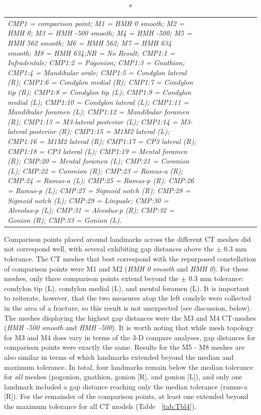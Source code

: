 \documentclass[review]{elsarticle}
\begin{document}
\begin{center}
\begin{longtable}{lrrrrrrrr}
\caption*{\textit{CMP1 = comparison point; M1 = HMH 0 smooth; M2 = HMH 0; M3 = HMH -500 smooth; M4 = HMH -500; M5 = HMH 562 smooth; M6 = HMH 562; M7 = HMH 634 smooth; M8 = HMH 634;NR = No Result; CMP1:1 = Infradentale; CMP1:2 = Pogonion; CMP1:3 = Gnathion; CMP1:4 = Mandibular orale; CMP1:5 = Condylon lateral (R); CMP1:6 = Condylon medial (R); CMP1:7 = Condylon tip (R); CMP1:8 = Condylon tip (L); CMP1:9 = Condylon medial (L); CMP1:10 = Condylon lateral (L); CMP1:11 = Mandibular foramen (L); CMP1:12 = Mandibular foramen (R); CMP1:13 = M3-lateral posterior (L); CMP1:14 = M3-lateral posterior (R); CMP1:15 = M1M2 lateral (L); CMP1:16 = M1M2 lateral (R); CMP1:17 = CP3 lateral (R); CMP1:18 = CP3 lateral (L); CMP1:19 = Mental foramen (R); CMP:20 = Mental foramen (L); CMP:21 = Coronion (L); CMP:22 = Coronion (R); CMP:23 = Ramus-a (R); CMP:24 = Ramus-a (L); CMP:25 = Ramus-p (R); CMP:26 = Ramus-p (L); CMP:27 = Sigmoid notch (R); CMP:28 = Sigmoid notch (L); CMP:29 = Linguale; CMP:30 = Alveolus-p (L); CMP:31 = Alveolus-p (R); CMP:32 = Gonion (R); CMP:33 = Gonion (L).}}
\end{longtable}
\end{center}

Comparison points placed around landmarks across the different CT meshes did not correspond well, with several exhibiting gap distances above the $\pm$ 0.3 mm tolerance. The CT meshes that best correspond with the repurposed constellation of comparison points were M1 and M2 (\textit{HMH 0 smooth} and \textit{HMH 0}). For these meshes, only three comparison points extend beyond the $\pm$ 0.3 mm tolerance: condylon tip (L), condylon medial (L), and mental foramen (L). It is important to reiterate, however, that the two measures atop the left condyle were collected in the area of a fracture, so this result is not unexpected (see discussion, below). The meshes displaying the highest gap distances were the M3 and M4 CT-meshes (\textit{HMH -500 smooth} and \textit{HMH -500}). It is worth noting that while mesh topology for M3 and M4 does vary in terms of the 3-D compare analyses, gap distances for comparison points were exactly the same. Results for the M5 - M8 meshes are also similar in terms of which landmarks extended beyond the median and maximum tolerance. In total, four landmarks remain below the median tolerance for \textit{all} meshes (pogonion, gnathion, gonion [R], and gonion [L]), and only one landmark included a gap distance reaching only the median tolerance (ramus-a [R]). For the remainder of the comparison points, at least one extended beyond the maximum tolerance for all CT models (Table ~\ref{tab:Tbl4}). 
\end{document}
